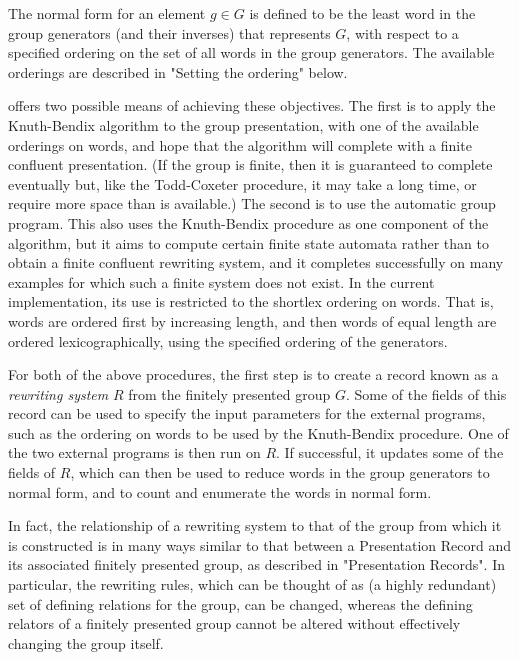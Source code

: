 The  normal form for an element  $g \in G$ is defined  to be the least
word in the group generators (and their inverses) that represents $G$,
with respect to  a specified ordering on the  set of all  words in the
group generators.  The available  orderings are described  in "Setting
the ordering" below.

{\KBMAG} offers two possible means of achieving these objectives.  The
first   is   to apply   the   Knuth-Bendix   algorithm  to  the  group
presentation, with one of the  available orderings on words, and  hope
that the algorithm will complete with a finite confluent presentation.
(If the group is finite, then it is  guaranteed to complete eventually
but,  like the  Todd-Coxeter procedure, it  may  take a long  time, or
require more space  than  is  available.)  The second  is  to  use the
automatic group program. This  also uses the Knuth-Bendix procedure as
one component of the algorithm, but  it aims to compute certain finite
state  automata rather  than to obtain   a  finite confluent rewriting
system, and it completes successfully on many  examples for which such
a finite system does not exist. In the current implementation, its use
is  restricted to the shortlex ordering  on words.  That is, words are
ordered first by increasing length, and then words of equal length are
ordered lexicographically,   using the    specified ordering  of   the
generators.

For both of the above procedures, the first step is to create a {\GAP}
record   known as  a  {\em  rewriting  system}  $R$ from the  finitely
presented group $G$.  Some of the fields of this record can be used to
specify  the input parameters  for the external  programs, such as the
ordering on words to be used by the Knuth-Bendix procedure. One of the
two  external programs is then run  on  $R$. If successful, it updates
some of the fields of $R$, which  can then be  used to reduce words in
the group  generators to normal form, and  to count and  enumerate the
words in normal form.

In fact, the relationship of a  rewriting system to  that of the group
from which it is constructed is in many ways similar to that between a
Presentation Record  and its associated  finitely presented  group, as
described in  "Presentation  Records".  In  particular, the  rewriting
rules, which can be thought of as (a highly redundant) set of defining
relations for the group, can be changed, whereas the defining relators
of a  finitely presented group  cannot be  altered without effectively
changing the group itself.

